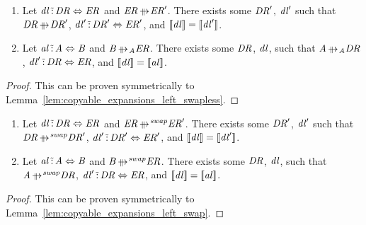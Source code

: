 \documentclass[numbers]{sigplanconf}
\begin{document}
\begin{lemma}
  \label{lem:copyable_expansions_right_swapless}\leavevmode
  \begin{enumerate}
  \item Let $\mathit{dl} \,\tilde{:}\, \mathit{DR} \Leftrightarrow
    \mathit{ER}$ and $\DNFRegexAlt \ParallelRewrite \DNFRegexAlt'$.  There exists some
    $\mathit{DR}'$, $\mathit{dl}'$ such that $\DNFRegex \ParallelRewrite
    \DNFRegex'$,
    $\mathit{dl}' \,\tilde{:}\,
    \mathit{DR}' \Leftrightarrow \mathit{ER}'$, and $[ \! [\mathit{dl}] \! ] =
    [ \! [\mathit{dl}'] \! ]$.
  \item Let $\mathit{al} \,\tilde{:}\, \mathit{A} \Leftrightarrow \mathit{B}$ and
    $\AtomAlt \ParallelRewriteAtom \DNFRegexAlt$.  There exists some $\mathit{DR}$,
    $\mathit{dl}$, such that $\Atom \ParallelRewriteAtom \DNFRegex$,
    $\mathit{dl}' \,\tilde{:}\, \mathit{DR}
    \Leftrightarrow \mathit{ER}$, and $[ \! [\mathit{dl}] \! ] =
    [ \! [\mathit{al}] \! ]$.
  \end{enumerate}
\end{lemma}
\begin{proof}
  This can be proven symmetrically to Lemma~\ref{lem:copyable_expansions_left_swapless}.
\end{proof}

\begin{lemma}
  \label{lem:copyable_expansions_right_swap}\leavevmode
  \begin{enumerate}
  \item Let $\mathit{dl} \,\tilde{:}\, \mathit{DR} \Leftrightarrow
    \mathit{ER}$ and $\DNFRegexAlt \ParallelRewriteSwap \DNFRegexAlt'$.  There exists some
    $\mathit{DR}'$, $\mathit{dl}'$ such that $\DNFRegex \ParallelRewriteSwap
    \DNFRegex'$,
    $\mathit{dl}' \,\tilde{:}\,
    \mathit{DR}' \Leftrightarrow \mathit{ER}'$, and $[ \! [\mathit{dl}] \! ] =
    [ \! [\mathit{dl}'] \! ]$.
  \item Let $\mathit{al} \,\tilde{:}\, \mathit{A} \Leftrightarrow \mathit{B}$ and
    $\AtomAlt \ParallelRewriteSwapAtom \DNFRegexAlt$.  There exists some $\mathit{DR}$,
    $\mathit{dl}$, such that $\Atom \ParallelRewriteSwapAtom \DNFRegex$,
    $\mathit{dl}' \,\tilde{:}\, \mathit{DR}
    \Leftrightarrow \mathit{ER}$, and $[ \! [\mathit{dl}] \! ] =
    [ \! [\mathit{al}] \! ]$.
  \end{enumerate}
\end{lemma}
\begin{proof}
  This can be proven symmetrically to Lemma~\ref{lem:copyable_expansions_left_swap}.
\end{proof}
\end{document}
